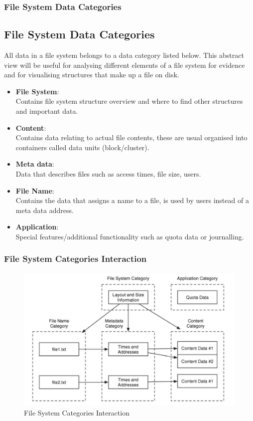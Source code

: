 \documentclass{beamer}
\begin{document}
\begin{frame}
	\frametitle{File System Data Categories}
	\subsection*{File System Data Categories}
	All data in a file system belongs to a data category listed below. This abstract view will be useful for analysing different elements of a file system for evidence and for visualising structures that make up a file on disk.
	\begin{itemize}
		\item \textbf{File System}: \\ Contains file system structure overview and where to find other structures and important data.
		\item \textbf{Content}: \\ Contains data relating to actual file contents, these are usual organised into containers called data units (block/cluster).
		\item \textbf{Meta data}: \\ Data that describes files such as access times, file size, users.
		\item \textbf{File Name}: \\ Contains the data that assigns a name to a file, is used by users instead of a meta data address.
		\item \textbf{Application}: \\ Special features/additional functionality such as quota data or journalling.	
	\end{itemize}	    
\end{frame}

\begin{frame}
	\frametitle{File System Categories Interaction}
	\begin{figure}[h]
		\includegraphics[scale=0.40]{fs-category-interaction-briancarrier}
		\caption{File System Categories Interaction}
		\label{fig:fs-category-interaction}
	\end{figure}
\end{frame}
\end{document}

